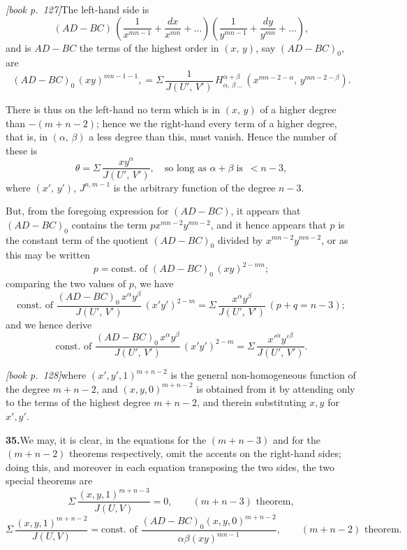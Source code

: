 \documentclass[11pt,a4paper]{article}
\theoremstyle{plain}
\theoremstyle{definition}
\theoremstyle{remark}
\begin{document}
\noindent\textit{[book p.~127]}\quad The left-hand side is
\[
(AD - BC)\,\left(\frac{1}{x^{mn-1}} + \frac{dx}{x^{mn}} + \ldots\right)\left(\frac{1}{y^{mn-1}} + \frac{dy}{y^{mn}} + \ldots\right),
\]
and is $AD - BC$ the terms of the highest order in $(x,\,y)$, say $(AD - BC)_0$, are
\[
(AD - BC)_0\,(xy)^{mn-1-1}, = \Sigma\,\frac{1}{J(U',\,V')}\,H^{\alpha+\beta}_{\alpha,\,\beta\,\ldots}\,(x^{mn-2-\alpha},\,y^{mn-2-\beta}).
\]

There is thus on the left-hand no term which is in $(x,\,y)$ of a higher degree than $-(m + n - 2)$; hence we the right-hand every term of a higher degree, that is, in $(\alpha,\,\beta)$ a less degree than this, must vanish. Hence the number of these is
\[
\theta = \Sigma\,\frac{xy^\alpha}{J(U',\,V')},\quad \text{so long as }\alpha + \beta\;\text{is }\,< n - 3,
\]
where $(x',\,y')$, $J^{n,m-1}$ is the arbitrary function of the degree $n - 3$.

But, from the foregoing expression for $(AD - BC)$, it appears that $(AD - BC)_0$ contains the term $px^{mn-2}y^{mn-2}$, and it hence appears that $p$ is the constant term of the quotient $(AD - BC)_0$ divided by $x^{mn-2}y^{mn-2}$, or as this may be written
\[
p = \text{const.\ of }(AD - BC)_0\,(xy)^{2-mn};
\]
comparing the two values of $p$, we have
\[
\text{const.\ of }\frac{(AD - BC)_0\,x^\alpha y^\beta}{J(U',\,V')}\,(x'y')^{2-m} = \Sigma\,\frac{x^\alpha y^\beta}{J(U',\,V')}\,(p + q = n - 3);
\]
and we hence derive
\[
\text{const.\ of }\frac{(AD - BC)_0\,x^\alpha y^\beta}{J(U',\,V')}\,(x'y')^{2-m} = \Sigma\,\frac{x'^\alpha y'^\beta}{J(U',\,V')}.
\]

\noindent\textit{[book p.~128]}\quad where $(x',y',1)^{m+n-2}$ is the
general non-homogeneous function of the degree $m+n-2$, and
$(x,y,0)^{m+n-2}$ is obtained from it by attending only to the terms of
the highest degree $m+n-2$, and therein substituting $x,y$ for $x',y'$.

\medskip\noindent\textbf{35.}\quad We may, it is clear, in the equations for
the $(m+n-3)$ and for the $(m+n-2)$ theorems respectively, omit the accents
on the right-hand sides; doing this, and moreover in each equation transposing
the two sides, the two special theorems are
\[
\Sigma\,\frac{(x,y,1)^{m+n-3}}{J(U,V)} = 0,
\qquad (m+n-3)\text{ theorem},
\]
\[
\Sigma\,\frac{(x,y,1)^{m+n-2}}{J(U,V)}
= \text{const. of }\frac{(AD-BC)_0(x,y,0)^{m+n-2}}{\alpha\beta(xy)^{mn-1}},
\qquad (m+n-2)\text{ theorem}.
\]
\end{document}
